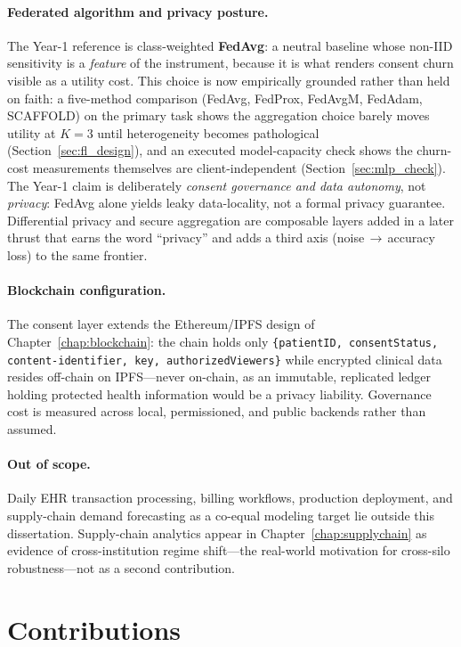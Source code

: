 \documentclass[12pt]{report}
\begin{document}
\paragraph{Federated algorithm and privacy posture.} The Year-1 reference is
class-weighted \textbf{FedAvg}: a neutral baseline whose non-IID sensitivity is a
\emph{feature} of the instrument, because it is what renders consent churn
visible as a utility cost. This choice is now empirically grounded rather than
held on faith: a five-method comparison (FedAvg, FedProx, FedAvgM, FedAdam,
SCAFFOLD) on the primary task shows the aggregation choice barely moves utility
at $K{=}3$ until heterogeneity becomes pathological
(Section~\ref{sec:fl_design}), and an executed model-capacity check shows the
churn-cost measurements themselves are client-independent
(Section~\ref{sec:mlp_check}). The Year-1 claim is deliberately
\emph{consent governance and data autonomy}, not \emph{privacy}: FedAvg alone
yields leaky data-locality, not a formal privacy guarantee. Differential privacy
and secure aggregation are composable layers added in a later thrust that earns
the word ``privacy'' and adds a third axis (noise\,$\rightarrow$\,accuracy loss)
to the same frontier.

\paragraph{Blockchain configuration.} The consent layer extends the
Ethereum/IPFS design of Chapter~\ref{chap:blockchain}: the chain holds only
\texttt{\{patientID, consentStatus, content-identifier, key, authorizedViewers\}}
while encrypted clinical data resides off-chain on IPFS---never on-chain, as an
immutable, replicated ledger holding protected health information would be a
privacy liability. Governance cost is measured across local, permissioned, and
public backends rather than assumed.

\paragraph{Out of scope.} Daily EHR transaction processing, billing workflows,
production deployment, and supply-chain demand forecasting as a co-equal modeling
target lie outside this dissertation. Supply-chain analytics appear in
Chapter~\ref{chap:supplychain} as evidence of cross-institution regime shift---the
real-world motivation for cross-silo robustness---not as a second contribution.

\section{Contributions}\label{sec:contributions}
\end{document}
